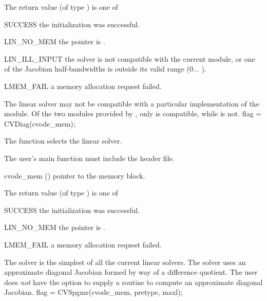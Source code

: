 {
  The return value  (of type ) is one of
  \begin{args}
  \item[SUCCESS] 
    the {\cvband} initialization was successful.
  \item[LIN\_NO\_MEM]
    the  pointer is .
  \item[LIN\_ILL\_INPUT]
    the {\cvband} solver is not compatible with the current {\nvector} module, or
    one of the Jacobian half-bandwidths is outside its valid range ($0 \ldots$ ).
  \item[LMEM\_FAIL]
    a memory allocation request failed.
  \end{args}
}
{
  The {\cvband} linear solver may not be compatible with a particular
  implementation of the {\nvector} module. Of the two {\nvector} modules 
  provided by {\sundials}, only {\nvecs} is compatible, while {\nvecp} is not.
}
{
  flag = CVDiag(cvode\_mem);
}
{
  The function  selects the {\cvdiag} linear solver. 

  The user's main function must include the  header file.
}
{
  \begin{args}
  \item[cvode\_mem] ()
    pointer to the {\cvodes} memory block.
  \end{args}
}
{
  The return value  (of type ) is one of
  \begin{args}
  \item[SUCCESS]
    the {\cvdiag} initialization was successful.
  \item[LIN\_NO\_MEM]
    the  pointer is .
  \item[LMEM\_FAIL]
    a memory allocation request failed.
  \end{args}
}
{
  The {\cvdiag} solver is the simplest of all the current {\cvodes} linear
  solvers. The 
  {\cvdiag} solver uses an approximate diagonal Jacobian formed by way of a difference 
  quotient. The user does {\em not} have the option to supply a routine to compute
  an approximate diagonal Jacobian.
}
{
  flag = CVSpgmr(cvode\_mem, pretype, maxl);
}
